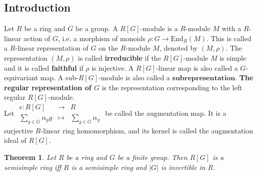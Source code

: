 \documentclass[12pt,letterpaper]{report}
\newtheorem{theorem}{Theorem}[section]
\begin{document}
\subsection{Introduction}
Let $R$ be a ring and $G$ be a group. A $R[G]$-module is a $R$-module $M$ with a $R$-linear action of $G$, i.e. a morphism of monoids $\rho:G\rightarrow \text{End}_{R}(M)$. This is called a $R$-linear representation of $G$ on the $R$-module $M$, denoted by $(M,\rho)$. The representation $(M,\rho)$ is called \textbf{irreducible} if the $R[G]$-module $M$ is simple and it is called\textbf{ faithful} if $\rho$ is injective. A $R[G]$-linear map is also called a $G$-equivariant map. A sub-$R[G]$-module is also called a $\textbf{subrepresentation}$. \textbf{The regular representation of $G$} is the representation corresponding to the left regular $R[G]$-module. 
\\\indent Let $\begin{array}{rrr}\epsilon:R[G]&\rightarrow&R\\\sum_{g\in G}\alpha_{g}g&\mapsto&\sum_{g\in G}\alpha_{g}\end{array}$ be called the augmentation map. It is a surjective $R$-linear ring homomorphism, and its kernel is called the augmentation ideal of $R[G]$.
\begin{theorem}Let $R$ be a ring and $G$ be a finite group. Then $R[G]$ is a semisimple ring iff $R$ is a semisimple ring and $|G|$ is invertible in $R$.\end{theorem}
\end{document}
